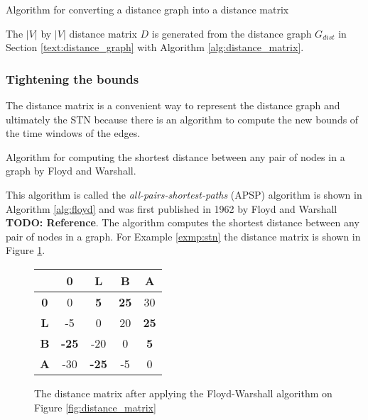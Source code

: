 \documentclass{article}
\theoremstyle{definition}
\providecommand{\SetAlgoLined}{\SetLine}
\newcommand{\TODO}[1]{{\color{red}\textbf{TODO: #1}}}
\newcommand{\weight}[2]{\ensuremath{weight(t_{#1}, t_{#2})}} %
\newenvironment{definition}[1][Definition]{\begin{trivlist}
\item[\hskip \labelsep {\bfseries #1}]}{\end{trivlist}}
\begin{document}
\begin{algorithm}[H]
\label{alg:distance_matrix}
\SetAlgoLined
\ForAll{$(t_i, t_j) \in E_{dist}$}{
	$D_{ij} = \weight{i}{j}$\;
}
\caption{Algorithm for converting a distance graph into a distance matrix}
\end{algorithm}

\begin{definition}
The $|V|$ by $|V|$ distance matrix $D$ is generated from the distance graph $G_{dist}$ in Section \ref{text:distance_graph} with Algorithm \ref{alg:distance_matrix}.
\end{definition}

\subsubsection{Tightening the bounds}
\label{text:floyd}
The distance matrix is a convenient way to represent the distance graph and ultimately the STN because there is an algorithm to compute the new bounds of the time windows of the edges. 

\begin{algorithm}[H]
\label{alg:floyd}
\SetAlgoLined
{}
\caption{Algorithm for computing the shortest distance between any pair of nodes in a graph by Floyd and Warshall. }
\end{algorithm}

This algorithm is called the \emph{all-pairs-shortest-paths} (APSP) algorithm is shown in Algorithm \ref{alg:floyd} and was first published in 1962 by Floyd and Warshall \TODO{Reference}.
The algorithm computes the shortest distance between any pair of nodes in a graph.
For Example \ref{exmp:stn} the distance matrix is shown in Figure \ref{fig:stn_dist_matrix}.

\begin{figure}[h]
	\centering
	\begin{tabular}{ c | c c c c }
	  			& \textbf{0}		& \textbf{L} 		& \textbf{B} 		& \textbf{A} \\ \hline
	  \textbf{0} 	& 0 				& \textbf{5}		& \textbf{25} 	& 30 \\
	  \textbf{L} 	& -5 			& 0				& 20			& \textbf{25} \\
	  \textbf{B} 	& \textbf{-25}	& -20			& 0				& \textbf{5} \\
	  \textbf{A} 	& -30			& \textbf{-25}	& -5 			& 0 \\
	\end{tabular}
	\caption{The distance matrix after applying the Floyd-Warshall algorithm on Figure \ref{fig:distance_matrix}}
	\label{fig:stn_dist_matrix}
\end{figure}
\end{document}

